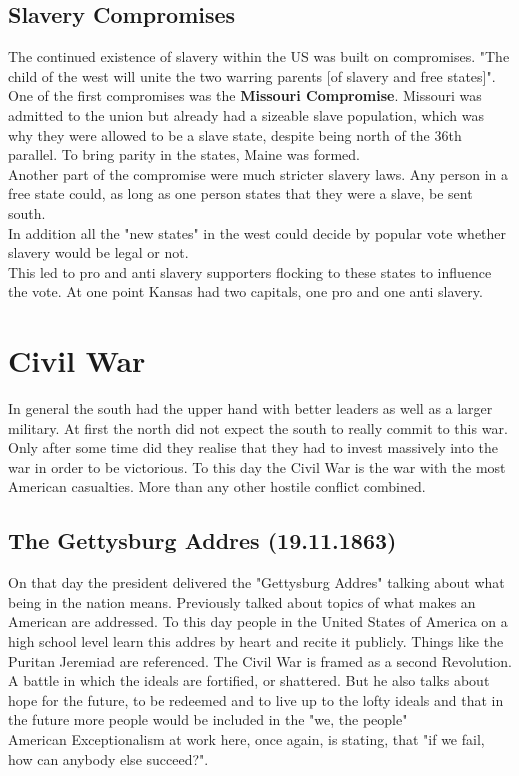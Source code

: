 \documentclass{article}
\begin{document}
	\subsection{Slavery Compromises}
	The continued existence of slavery within the US was built on compromises. "The child of the west will unite the two warring parents [of slavery and free states]". \\
	One of the first compromises was the \textbf{Missouri Compromise}. Missouri was admitted to the union but already had a sizeable slave population, which was why they were allowed to be a slave state, despite being north of the 36th parallel. To bring parity in the states, Maine was formed. \\
	Another part of the compromise were much stricter slavery laws. Any person in a free state could, as long as one person states that they were a slave, be sent south. \\
	In addition all the "new states" in the west could decide by popular vote whether slavery would be legal or not. \\
	This led to pro and anti slavery supporters flocking to these states to influence the vote. At one point Kansas had two capitals, one pro and one anti slavery. \\
	\section{Civil War}
	In general the south had the upper hand with better leaders as well as a larger military. At first the north did not expect the south to really commit to this war. Only after some time did they realise that they had to invest massively into the war in order to be victorious. To this day the Civil War is the war with the most American casualties. More than any other hostile conflict combined. \\
	\subsection{The Gettysburg Addres (19.11.1863)}
	On that day the president delivered the "Gettysburg Addres" talking about what being in the nation means. Previously talked about topics of what makes an American are addressed. To this day people in the United States of America on a high school level learn this addres by heart and recite it publicly. Things like the Puritan Jeremiad are referenced. The Civil War is framed as a second Revolution. A battle in which the ideals are fortified, or shattered. But he also talks about hope for the future, to be redeemed and to live up to the lofty ideals and that in the future more people would be included in the "we, the people" \\
	American Exceptionalism at work here, once again, is stating, that "if we fail, how can anybody else succeed?". \\
\end{document}
